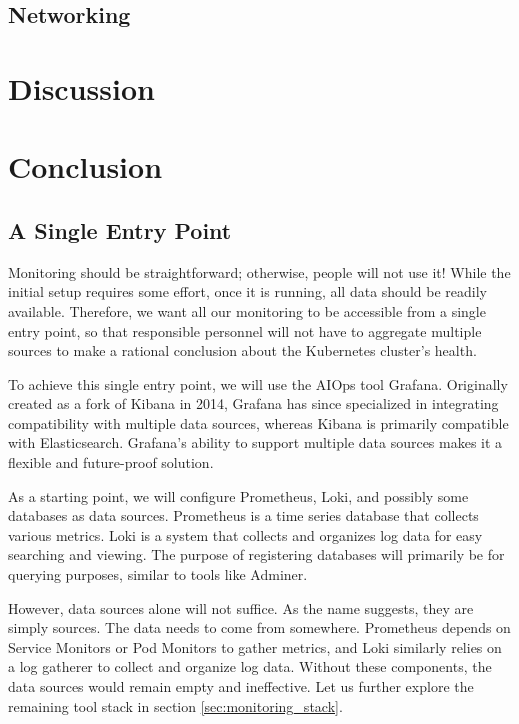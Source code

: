 \section{Networking}

\chapter{Discussion}

\chapter{Conclusion}

\cleardoublepage
{}
{}
\printbibliography


\section{A Single Entry Point}
Monitoring should be straightforward; otherwise, people will not use it! While the initial setup requires some effort, once it is running, all data should be readily available. Therefore, we want all our monitoring to be accessible from a single entry point, so that responsible personnel will not have to aggregate multiple sources to make a rational conclusion about the Kubernetes cluster's health.

To achieve this single entry point, we will use the AIOps tool Grafana. Originally created as a fork of Kibana in 2014, Grafana has since specialized in integrating compatibility with multiple data sources, whereas Kibana is primarily compatible with Elasticsearch. Grafana's ability to support multiple data sources makes it a flexible and future-proof solution.

As a starting point, we will configure Prometheus, Loki, and possibly some databases as data sources. Prometheus is a time series database that collects various metrics. Loki is a system that collects and organizes log data for easy searching and viewing. The purpose of registering databases will primarily be for querying purposes, similar to tools like Adminer.

However, data sources alone will not suffice. As the name suggests, they are simply sources. The data needs to come from somewhere. Prometheus depends on Service Monitors or Pod Monitors to gather metrics, and Loki similarly relies on a log gatherer to collect and organize log data. Without these components, the data sources would remain empty and ineffective. Let us further explore the remaining tool stack in section \ref{sec:monitoring_stack}.


